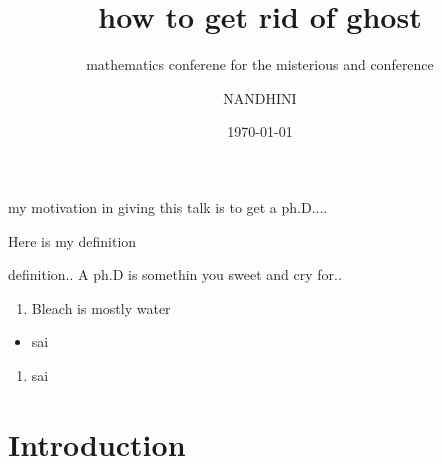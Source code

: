 \documentclass{beamer}
\title{how to get rid of ghost}
\subtitle{mathematics conferene for the misterious and conference}
\author{NANDHINI}
\date{\today}
\begin{document}
\begin{frame}
    \maketitle
\end{frame}
\begin{frame}
    my motivation in giving this talk is to get a ph.D....
\end{frame}
\begin{frame}[t]
    \vspace{2cm}
    Here is my definition
    \begin{block}{definition..}
    A ph.D is somethin you sweet and cry for..
    \end{block}
\end{frame}
\begin{frame}
    \begin{enumerate}
        \item Bleach is mostly water
    \end{enumerate}
    \begin{itemize}
        \item sai
    \end{itemize}
    \begin{enumerate}
        \item sai
    \end{enumerate}
\end{frame}
    
\section{Introduction}
\end{document}
